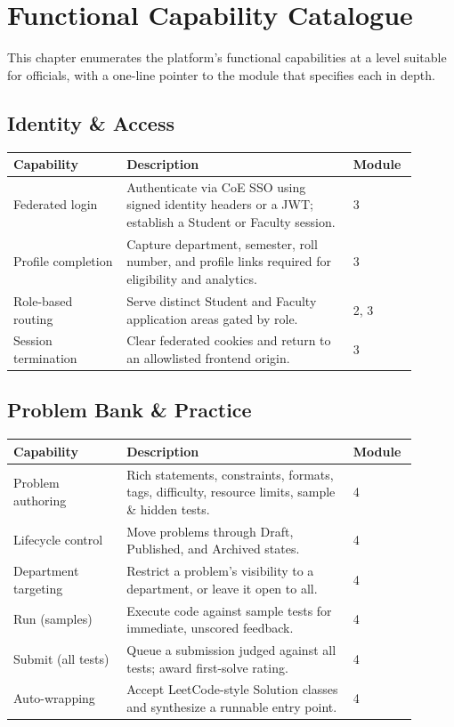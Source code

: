 \documentclass[12pt,a4paper,oneside]{report}
\begin{document}
\chapter{Functional Capability Catalogue}
This chapter enumerates the platform's functional capabilities at a level
suitable for officials, with a one-line pointer to the module that specifies
each in depth.

\section{Identity \& Access}
\begin{longtable}{@{}p{0.26\linewidth} p{0.52\linewidth} p{0.12\linewidth}@{}}
\toprule
\textbf{Capability} & \textbf{Description} & \textbf{Module}\\
\midrule
\endhead
Federated login & Authenticate via CoE SSO using signed identity headers or a JWT; establish a Student or Faculty session. & 3\\
Profile completion & Capture department, semester, roll number, and profile links required for eligibility and analytics. & 3\\
Role-based routing & Serve distinct Student and Faculty application areas gated by role. & 2, 3\\
Session termination & Clear federated cookies and return to an allowlisted frontend origin. & 3\\
\bottomrule
\end{longtable}

\section{Problem Bank \& Practice}
\begin{longtable}{@{}p{0.26\linewidth} p{0.52\linewidth} p{0.12\linewidth}@{}}
\toprule
\textbf{Capability} & \textbf{Description} & \textbf{Module}\\
\midrule
\endhead
Problem authoring & Rich statements, constraints, formats, tags, difficulty, resource limits, sample \& hidden tests. & 4\\
Lifecycle control & Move problems through Draft, Published, and Archived states. & 4\\
Department targeting & Restrict a problem's visibility to a department, or leave it open to all. & 4\\
Run (samples) & Execute code against sample tests for immediate, unscored feedback. & 4\\
Submit (all tests) & Queue a submission judged against all tests; award first-solve rating. & 4\\
Auto-wrapping & Accept LeetCode-style Solution classes and synthesize a runnable entry point. & 4\\
\bottomrule
\end{longtable}
\end{document}
